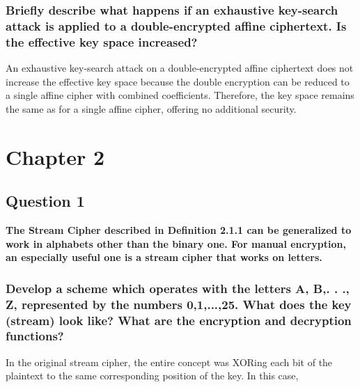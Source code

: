 \documentclass[titlepage]{article}
\begin{document}
{{\subsubsection{Briefly describe what happens if an exhaustive key-search attack is applied to a
double-encrypted affine ciphertext. Is the effective key space increased?}
{
An exhaustive key-search attack on a double-encrypted affine ciphertext does not increase the effective key space because the double encryption can be reduced to a single affine cipher with combined coefficients. Therefore, the key space remains the same as for a single affine cipher, offering no additional security.
}
}
}
\clearpage
\section{Chapter 2}
{
\subsection{Question 1}
{
\textbf{The Stream Cipher described in Definition 2.1.1 can be generalized to work in alphabets other than the binary one. For manual encryption, an especially useful one is a stream cipher that works on letters.}
\subsubsection{Develop a scheme which operates with the letters A, B,. . ., Z, represented by the numbers 0,1,...,25. What does the key (stream) look like? What are the encryption and decryption functions?}
{
In the original stream cipher, the entire concept was XORing each bit of the plaintext to the same corresponding position of the key. In this case, 
}
}
}
\end{document}
